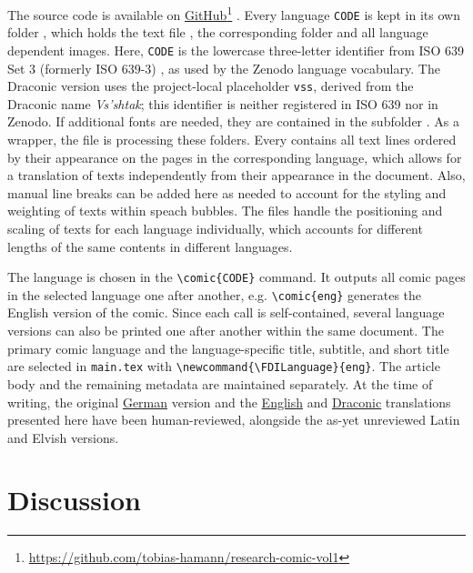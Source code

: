 \documentclass{inggrid}
\newcommand{\FDILanguage}{eng}
\begin{document}
The source code is available on \href{https://github.com/tobias-hamann/research-comic-vol1}{GitHub}\footnote{\url{https://github.com/tobias-hamann/research-comic-vol1}} \cite{Hamann_A_FAIR_Comic_2026}. 
Every language \verb|CODE| is kept in its own folder , which holds the text file , the corresponding folder  and all language dependent images. 
Here, \verb|CODE| is the lowercase three-letter identifier from ISO 639 Set 3 (formerly ISO 639-3) \cite{iso_639_2023}, as used by the Zenodo language vocabulary.
The Draconic version uses the project-local placeholder \verb|vss|, derived from the Draconic name \emph{Vs'shtak}; this identifier is neither registered in ISO 639 nor in Zenodo.
If additional fonts are needed, they are contained in the subfolder .
As a wrapper, the file  is processing these folders.
Every  contains all text lines ordered by their appearance on the pages in the corresponding language, which allows for a translation of texts independently from their appearance in the document.
Also, manual line breaks can be added here as needed to account for the styling and weighting of texts within speach bubbles.
The  files handle the positioning and scaling of texts for each language individually, which accounts for different lengths of the same contents in different languages.

The language is chosen in the \verb|\comic{CODE}| command.
It outputs all comic pages in the selected language one after another, e.g. \verb|\comic{eng}| generates the English version of the comic.
Since each call is self-contained, several language versions can also be printed one after another within the same document.
The primary comic language and the language-specific title, subtitle, and short title are selected in \verb|main.tex| with \verb|\newcommand{\FDILanguage}{eng}|. The article body and the remaining metadata are maintained separately.
At the time of writing, the original \hyperref[comic:deu]{German} version
and the \hyperref[comic:eng]{English} and \hyperref[comic:vss]{Draconic} translations presented here have been human-reviewed, alongside the as-yet unreviewed Latin and Elvish versions.

\section{Discussion}
\end{document}

